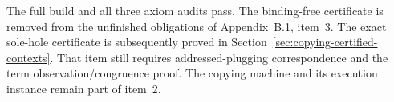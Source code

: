 





The full build and all three axiom audits pass. The binding-free certificate
is removed from the unfinished obligations of Appendix~B.1, item~3. The exact sole-hole certificate is subsequently proved in
Section~\ref{sec:copying-certified-contexts}. That item still requires
addressed-plugging correspondence and the term observation/congruence proof. The copying machine and its execution
instance remain part of item~2.
